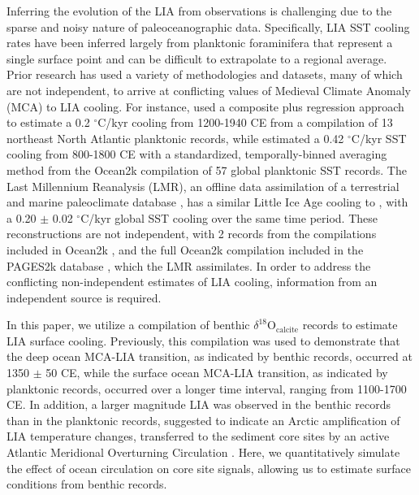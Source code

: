 \documentclass[draft]{agujournal2019}
\begin{document}
Inferring the evolution of the LIA from observations is challenging
 due to the sparse and noisy nature of paleoceanographic
data. Specifically, LIA SST cooling rates have been inferred largely from planktonic
foraminifera \cite{ocean2k} that represent a single surface point and can be difficult to
extrapolate to a regional average.
Prior research has used a variety of methodologies and datasets, many of which are  not independent, to arrive at
conflicting values of Medieval Climate Anomaly (MCA) to LIA cooling.
For instance,  used a composite plus regression approach to estimate a 0.2 $^{\circ}$C/kyr cooling
from 1200-1940 CE from a compilation of 13 
northeast North Atlantic planktonic records, while
 estimated a 0.42 $^{\circ}$C/kyr SST cooling from 
800-1800 CE with a standardized,
temporally-binned averaging method from the Ocean2k compilation of 57 global planktonic SST records.
The Last Millennium Reanalysis (LMR), an offline data assimilation of a terrestrial and marine
paleoclimate database \cite{Emile-Geay-McKay-2017:global}, has a similar Little Ice Age cooling to , with a 0.20 $\pm$ 0.02 $^{\circ}$C/kyr global SST cooling over the same time period.
These reconstructions are not independent, with 2 records from the
   compilations included in
  Ocean2k \cite{ocean2k}, and the full Ocean2k compilation included in the PAGES2k
  database \cite{Consortium--2013:Continental}, which the LMR assimilates. In order
    to address the conflicting non-independent estimates of LIA cooling,
    information from an independent source is required.

In this paper, we
utilize a compilation of benthic $\delta^{18}\mathrm{O}_{\mathrm{calcite}}$ records
to estimate LIA surface cooling.
Previously, this compilation
was used to demonstrate that the
deep ocean MCA-LIA transition, as indicated by benthic records,
occurred at 1350 $\pm$ 50 CE, while the surface ocean MCA-LIA
transition, as indicated by planktonic records, occurred over a longer
time interval, ranging from 1100-1700 CE. In addition, a larger magnitude LIA was
observed in the benthic records than in the planktonic records,
suggested to indicate an Arctic amplification of LIA temperature
changes, transferred to the sediment core sites by an active Atlantic
Meridional Overturning Circulation \cite[]{Lu-Oppo-2023:Surface}.
Here, we quantitatively simulate
the effect of ocean circulation on core site signals, allowing us
to estimate surface conditions from benthic records.
\end{document}
